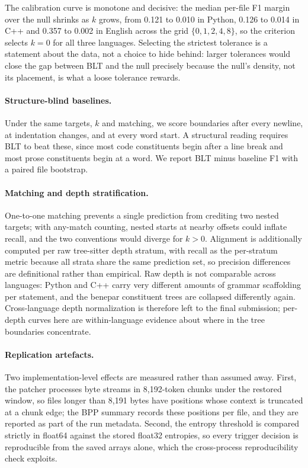 The calibration curve is monotone and decisive: the median per-file F1 margin over the null shrinks as $k$ grows, from 0.121 to 0.010 in Python, 0.126 to 0.014 in C++ and 0.357 to 0.002 in English across the grid $\{0,1,2,4,8\}$, so the criterion selects $k=0$ for all three languages. Selecting the strictest tolerance is a statement about the data, not a choice to hide behind: larger tolerances would close the gap between BLT and the null precisely because the null's density, not its placement, is what a loose tolerance rewards.

\paragraph{Structure-blind baselines.} Under the same targets, $k$ and matching, we score boundaries after every newline, at indentation changes, and at every word start. A structural reading requires BLT to beat these, since most code constituents begin after a line break and most prose constituents begin at a word. We report BLT minus baseline F1 with a paired file bootstrap.

\paragraph{Matching and depth stratification.} One-to-one matching prevents a single prediction from crediting two nested targets; with any-match counting, nested starts at nearby offsets could inflate recall, and the two conventions would diverge for $k>0$. Alignment is additionally computed per raw tree-sitter depth stratum, with recall as the per-stratum metric because all strata share the same prediction set, so precision differences are definitional rather than empirical. Raw depth is not comparable across languages: Python and C++ carry very different amounts of grammar scaffolding per statement, and the benepar constituent trees are collapsed differently again. Cross-language depth normalization is therefore left to the final submission; per-depth curves here are within-language evidence about where in the tree boundaries concentrate.

\paragraph{Replication artefacts.} Two implementation-level effects are measured rather than assumed away. First, the patcher processes byte streams in 8{,}192-token chunks under the restored window, so files longer than 8{,}191 bytes have positions whose context is truncated at a chunk edge; the BPP summary records these positions per file, and they are reported as part of the run metadata. Second, the entropy threshold is compared strictly in float64 against the stored float32 entropies, so every trigger decision is reproducible from the saved arrays alone, which the cross-process reproducibility check exploits.

